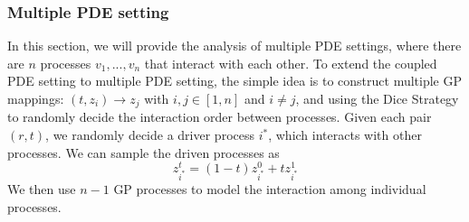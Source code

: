 \documentclass{article}
\begin{document}
\subsubsection{Multiple PDE setting}
\label{sec:Gaussian_multiple}
In this section, we will provide the analysis of multiple PDE settings, where there are $n$ processes $v_1, ..., v_n$ that interact with each other. To extend the coupled PDE setting to multiple PDE setting, the simple idea is to construct multiple GP mappings: $(t, z_i) \to z_j$ with $i,j \in [1,n]$ and $i \neq j$, and using the Dice Strategy to randomly decide the interaction order between processes. Given each pair $(r, t)$, we randomly decide a driver process $i^*$, which interacts with other processes. We can sample the driven processes as 
\begin{equation}
    z^t_{i^*} = (1-t)z^0_{i^*} + t z^1_{i^*}
\end{equation}
We then use $n-1$ GP processes to model the interaction among individual processes.
\end{document}
